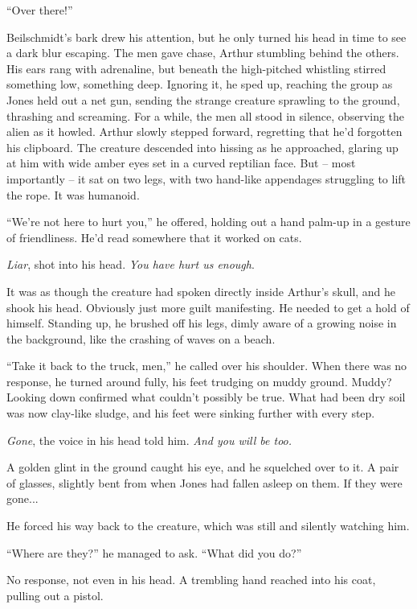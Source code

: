 “Over there!” 

Beilschmidt’s bark drew his attention, but he only turned his head in time to see a dark blur escaping. The men gave chase, Arthur stumbling behind the others. His ears rang with adrenaline, but beneath the high-pitched whistling stirred something low, something deep. Ignoring it, he sped up, reaching the group as Jones held out a net gun, sending the strange creature sprawling to the ground, thrashing and screaming. For a while, the men all stood in silence, observing the alien as it howled. Arthur slowly stepped forward, regretting that he’d forgotten his clipboard. The creature descended into hissing as he approached, glaring up at him with wide amber eyes set in a curved reptilian face. But – most importantly – it sat on two legs, with two hand-like appendages struggling to lift the rope. It was humanoid. 

“We’re not here to hurt you,” he offered, holding out a hand palm-up in a gesture of friendliness. He’d read somewhere that it worked on cats. 

\textit{Liar}, shot into his head. \textit{You have hurt us enough}. 

It was as though the creature had spoken directly inside Arthur’s skull, and he shook his head. Obviously just more guilt manifesting. He needed to get a hold of himself. Standing up, he brushed off his legs, dimly aware of a growing noise in the background, like the crashing of waves on a beach. 

“Take it back to the truck, men,” he called over his shoulder. When there was no response, he turned around fully, his feet trudging on muddy ground. Muddy? Looking down confirmed what couldn’t possibly be true. What had been dry soil was now clay-like sludge, and his feet were sinking further with every step. 

\textit{Gone}, the voice in his head told him. \textit{And you will be too. }

A golden glint in the ground caught his eye, and he squelched over to it. A pair of glasses, slightly bent from when Jones had fallen asleep on them. If they were gone... 

He forced his way back to the creature, which was still and silently watching him. 

“Where are they?” he managed to ask. “What did you do?” 

No response, not even in his head. A trembling hand reached into his coat, pulling out a pistol. 

